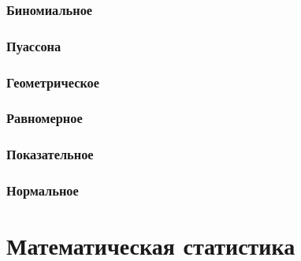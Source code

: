 \subsubsection{Биномиальное}
\subsubsection{Пуассона}
\subsubsection{Геометрическое}
\subsubsection{Равномерное}
\subsubsection{Показательное}
\subsubsection{Нормальное}

\section{Математическая статистика}